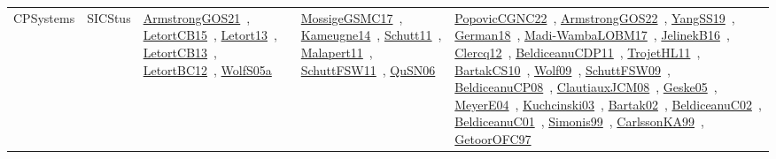 {\begin{longtable}{lp{3cm}>{\raggedright\arraybackslash}p{6cm}>{\raggedright\arraybackslash}p{6cm}>{\raggedright\arraybackslash}p{8cm}}
\index{SICStus}\index{CPSystems!SICStus}CPSystems & SICStus & \href{../works/ArmstrongGOS21.pdf}{ArmstrongGOS21}~\cite{ArmstrongGOS21}, \href{../works/LetortCB15.pdf}{LetortCB15}~\cite{LetortCB15}, \href{../works/Letort13.pdf}{Letort13}~\cite{Letort13}, \href{../works/LetortCB13.pdf}{LetortCB13}~\cite{LetortCB13}, \href{../works/LetortBC12.pdf}{LetortBC12}~\cite{LetortBC12}, \href{../works/WolfS05a.pdf}{WolfS05a}~\cite{WolfS05a} & \href{../works/MossigeGSMC17.pdf}{MossigeGSMC17}~\cite{MossigeGSMC17}, \href{../works/Kameugne14.pdf}{Kameugne14}~\cite{Kameugne14}, \href{../works/Schutt11.pdf}{Schutt11}~\cite{Schutt11}, \href{../works/Malapert11.pdf}{Malapert11}~\cite{Malapert11}, \href{../works/SchuttFSW11.pdf}{SchuttFSW11}~\cite{SchuttFSW11}, \href{../works/QuSN06.pdf}{QuSN06}~\cite{QuSN06} & \href{../works/PopovicCGNC22.pdf}{PopovicCGNC22}~\cite{PopovicCGNC22}, \href{../works/ArmstrongGOS22.pdf}{ArmstrongGOS22}~\cite{ArmstrongGOS22}, \href{../works/YangSS19.pdf}{YangSS19}~\cite{YangSS19}, \href{../works/German18.pdf}{German18}~\cite{German18}, \href{../works/Madi-WambaLOBM17.pdf}{Madi-WambaLOBM17}~\cite{Madi-WambaLOBM17}, \href{../works/JelinekB16.pdf}{JelinekB16}~\cite{JelinekB16}, \href{../works/Clercq12.pdf}{Clercq12}~\cite{Clercq12}, \href{../works/BeldiceanuCDP11.pdf}{BeldiceanuCDP11}~\cite{BeldiceanuCDP11}, \href{../works/TrojetHL11.pdf}{TrojetHL11}~\cite{TrojetHL11}, \href{../works/BartakCS10.pdf}{BartakCS10}~\cite{BartakCS10}, \href{../works/Wolf09.pdf}{Wolf09}~\cite{Wolf09}, \href{../works/SchuttFSW09.pdf}{SchuttFSW09}~\cite{SchuttFSW09}, \href{../works/BeldiceanuCP08.pdf}{BeldiceanuCP08}~\cite{BeldiceanuCP08}, \href{../works/ClautiauxJCM08.pdf}{ClautiauxJCM08}~\cite{ClautiauxJCM08}, \href{../works/Geske05.pdf}{Geske05}~\cite{Geske05}, \href{../works/MeyerE04.pdf}{MeyerE04}~\cite{MeyerE04}, \href{../works/Kuchcinski03.pdf}{Kuchcinski03}~\cite{Kuchcinski03}, \href{../works/Bartak02.pdf}{Bartak02}~\cite{Bartak02}, \href{../works/BeldiceanuC02.pdf}{BeldiceanuC02}~\cite{BeldiceanuC02}, \href{../works/BeldiceanuC01.pdf}{BeldiceanuC01}~\cite{BeldiceanuC01}, \href{../works/Simonis99.pdf}{Simonis99}~\cite{Simonis99}, \href{../works/CarlssonKA99.pdf}{CarlssonKA99}~\cite{CarlssonKA99}, \href{../works/GetoorOFC97.pdf}{GetoorOFC97}~\cite{GetoorOFC97}\\

\end{longtable}}
